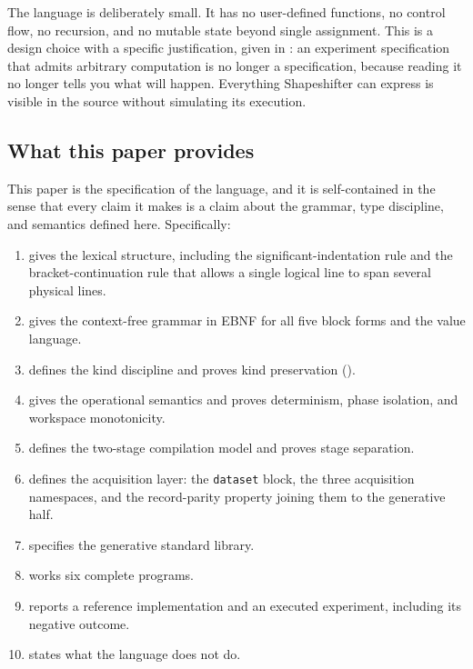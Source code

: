 \documentclass[11pt,twocolumn,a4paper]{article}
\theoremstyle{ssthm}
\theoremstyle{definition}
\theoremstyle{remark}
\newcommand{\shk}[1]{\texttt{#1}}
\begin{document}
The language is deliberately small. It has no user-defined functions, no
control flow, no recursion, and no mutable state beyond single
assignment. This is a design choice with a specific justification, given
in : an experiment specification that admits arbitrary
computation is no longer a specification, because reading it no longer
tells you what will happen. Everything Shapeshifter can express is
visible in the source without simulating its execution.

\subsection{What this paper provides}

This paper is the specification of the language, and it is self-contained
in the sense that every claim it makes is a claim about the grammar,
type discipline, and semantics defined here. Specifically:

\begin{enumerate}[label=(\roman*),leftmargin=2.2em,itemsep=2pt]
\item {} gives the lexical structure, including the
      significant-indentation rule and the bracket-continuation rule that
      allows a single logical line to span several physical lines.
\item {} gives the context-free grammar in EBNF
      \citep{backus1960notation,knuth1964backus} for all five block forms
      and the value language.
\item {} defines the kind discipline and proves kind
      preservation ().
\item {} gives the operational semantics and proves
      determinism, phase isolation, and workspace monotonicity.
\item {} defines the two-stage compilation model and
      proves stage separation.
\item {} defines the acquisition layer: the
      \shk{dataset} block, the three acquisition namespaces, and the
      record-parity property joining them to the generative half.
\item {} specifies the generative standard library.
\item {} works six complete programs.
\item {} reports a reference implementation and an
      executed experiment, including its negative outcome.
\item {} states what the language does not do.
\end{enumerate}
\end{document}
